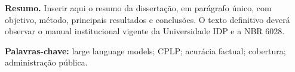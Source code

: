 \begin{resumo}
\noindent
\textbf{Resumo.} Inserir aqui o resumo da dissertação, em parágrafo único, com objetivo, método, principais resultados e conclusões. O texto definitivo deverá observar o manual institucional vigente da Universidade IDP e a NBR 6028.

\vspace{\onelineskip}
\noindent
\textbf{Palavras-chave:} large language models; CPLP; acurácia factual; cobertura; administração pública.
\end{resumo}
